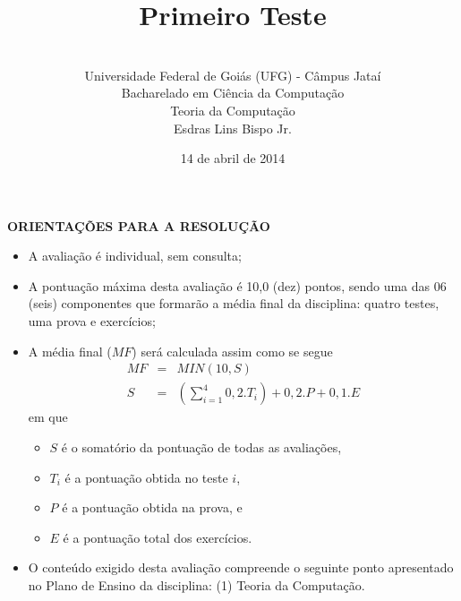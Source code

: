 \documentclass[12pt,a4paper,oneside]{article}
\author{\\Universidade Federal de Goiás (UFG) - Câmpus Jataí\\Bacharelado em Ciência da Computação \\Teoria da Computação \\Esdras Lins Bispo Jr.}
\date{14 de abril de 2014}
\title{\sc \huge Primeiro Teste}
\begin{document}
\maketitle

{\bf ORIENTAÇÕES PARA A RESOLUÇÃO}

\begin{itemize}
	\item A avaliação é individual, sem consulta;
	\item A pontuação máxima desta avaliação é 10,0 (dez) pontos, sendo uma das 06 (seis) componentes que formarão a média final da disciplina: quatro testes, uma prova e exercícios;
	\item A média final ($MF$) será calculada assim como se segue
	\begin{eqnarray}
		MF & = & MIN(10, S) \nonumber \\
		S & = & (\sum_{i=1}^{4} 0,2.T_i ) + 0,2.P  + 0,1.E \nonumber
	\end{eqnarray}
	em que 
	\begin{itemize}
		\item $S$ é o somatório da pontuação de todas as avaliações,
		\item $T_i$ é a pontuação obtida no teste $i$,
		\item $P$ é a pontuação obtida na prova, e
		\item $E$ é a pontuação total dos exercícios.
	\end{itemize}
	\item O conteúdo exigido desta avaliação compreende o seguinte ponto apresentado no Plano de Ensino da disciplina: (1) Teoria da Computação.
\end{itemize}

\begin{center}
\end{center}

\newpage
\end{document}
